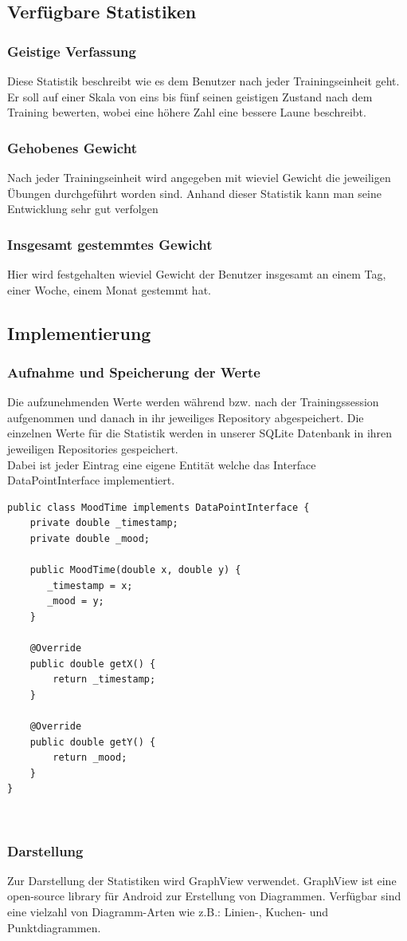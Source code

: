 \documentclass[FIPLY_base.tex]{subfiles}
\begin{document}
\newpage
\subsection{Verfügbare Statistiken}
\subsubsection{Geistige Verfassung}
Diese Statistik beschreibt wie es dem Benutzer nach jeder Trainingseinheit geht.
Er soll auf einer Skala von eins bis fünf seinen geistigen Zustand nach dem Training bewerten, wobei eine höhere Zahl eine bessere Laune beschreibt.
\subsubsection{Gehobenes Gewicht}
Nach jeder Trainingseinheit wird angegeben mit wieviel Gewicht die jeweiligen Übungen durchgeführt worden sind.
Anhand dieser Statistik kann man seine Entwicklung sehr gut verfolgen
\subsubsection{Insgesamt gestemmtes Gewicht}
Hier wird festgehalten wieviel Gewicht der Benutzer insgesamt an einem Tag, einer Woche, einem Monat gestemmt hat.

\newpage
\subsection{Implementierung}
\subsubsection{Aufnahme und Speicherung der Werte}
Die aufzunehmenden Werte werden während bzw. nach der Trainingssession aufgenommen und danach in ihr jeweiliges Repository abgespeichert.
Die einzelnen Werte für die Statistik werden in unserer SQLite Datenbank in ihren jeweiligen Repositories gespeichert.
\ \\
Dabei ist jeder Eintrag eine eigene Entität welche das Interface DataPointInterface implementiert.

\begin{lstlisting}
public class MoodTime implements DataPointInterface {
    private double _timestamp;
    private double _mood;

    public MoodTime(double x, double y) {
       _timestamp = x;
       _mood = y;
    }

    @Override
    public double getX() {
        return _timestamp;
    }

    @Override
    public double getY() {
        return _mood;
    }
}
\end{lstlisting}

\ \\

\subsubsection{Darstellung}
Zur Darstellung der Statistiken wird GraphView verwendet. GraphView ist eine open-source library für Android zur Erstellung von Diagrammen.
Verfügbar sind eine vielzahl von Diagramm-Arten wie z.B.: Linien-, Kuchen- und Punktdiagrammen.
\end{document}
